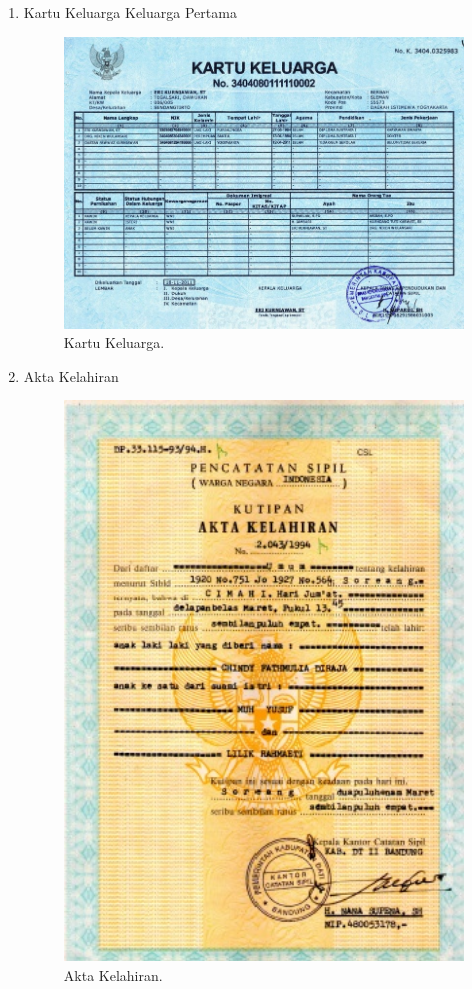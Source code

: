 \begin{enumerate}

	\item Kartu Keluarga Keluarga Pertama
	\begin{figure}[H]
		\centering
		\includegraphics[width=12cm]{figures/kk.jpg}
		\caption{Kartu Keluarga.}	
	\end{figure}

	\item Akta Kelahiran
	\begin{figure}[H]
		\centering
		\includegraphics[width=12cm]{figures/akte.jpg}
		\caption{Akta Kelahiran.}	
	\end{figure}


\end{enumerate}
